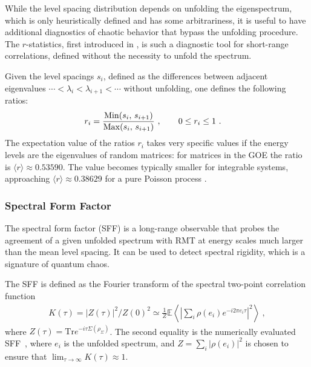 \documentclass{article}
\DeclareMathOperator{\tr}{tr}
\def\tr{\textrm{Tr}}
\begin{document}
While the level spacing distribution depends on unfolding the eigenspectrum, which is only heuristically defined and has some arbitrariness, it is useful to have additional diagnostics of chaotic behavior that bypass the unfolding procedure. The $r$-statistics, first introduced in \cite{huse_r_stat}, is such a diagnostic tool for short-range correlations, defined without the necessity to unfold the spectrum.

Given the level spacings $s_i$, defined as the differences between adjacent eigenvalues $\cdots < \lambda_i < \lambda_{i+1} < \cdots$ without unfolding, one defines the following ratios:
\begin{align}
\label{eq:ri_definition}
& r_i = \frac{{\rm Min}(s_i, \, s_{i+1})}{{\rm Max}(s_i, \, s_{i+1})} \ ,  \qquad
0\leq r_i \leq 1 \ .
\end{align}
The expectation value of the ratios $r_i$ takes very specific values if the energy levels are the eigenvalues of random matrices: for matrices in the GOE the ratio is $\langle r\rangle \approx 0.53590$.
The value becomes typically smaller for integrable systems, approaching $\langle r \rangle \approx 0.38629$ for a pure Poisson process \cite{r_ratios_theory_values}.


\subsubsection{Spectral Form Factor}

The spectral form factor (SFF) is a long-range observable that probes the agreement of a given unfolded spectrum with RMT at energy scales much larger than the mean level spacing. It can be used to detect spectral rigidity, which is a signature of quantum chaos.

The SFF is defined as the Fourier transform of the spectral two-point correlation function \cite{Shenker_et_al_SFF_first,Liu_2018}
\begin{align}
    \label{eq:SFF_def}
    K(\tau) = {|Z(\tau)|^2}/{Z(0)^2}
    \simeq
    \frac{1}{Z}
    \mathbb{E}
    \left\langle |{\sum_{i} \rho(e_i) e^{- i 2 \pi e_i \tau}}|^2 \right\rangle \ ,
\end{align}
where $Z(\tau) = \tr e^{- i \tau \Sigma( \rho_\Sigma)}$. 
The second equality is the numerically evaluated SFF~\cite{vidmar_1905.06345}, where $e_i$ is the unfolded spectrum, and $Z =  \sum_i |{\rho(e_i)}|^2$ is chosen to ensure that $\lim_{\tau\to\infty}K(\tau) \approx 1$.
\end{document}
